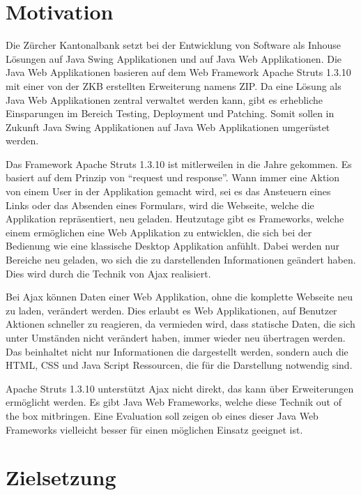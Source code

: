   \section{Motivation}
  
  Die Zürcher Kantonalbank setzt bei der Entwicklung von Software als Inhouse
  Lösungen auf Java Swing Applikationen und auf Java Web Applikationen. Die
  Java Web Applikationen basieren auf dem Web Framework Apache Struts 1.3.10
  mit einer von der ZKB erstellten Erweiterung namens \ac{ZIP}. Da eine Lösung
  als Java Web Applikationen zentral verwaltet werden kann, gibt es erhebliche
  Einsparungen im Bereich Testing, Deployment und Patching. Somit sollen in
  Zukunft Java Swing Applikationen auf Java Web Applikationen umgerüstet
  werden.
  
  Das Framework Apache Struts 1.3.10 ist mitlerweilen in die Jahre gekommen. Es
  basiert auf dem Prinzip von ``request und response''. Wann immer eine Aktion
  von einem User in der Applikation gemacht wird, sei es das Ansteuern eines
  Links oder das Absenden eines Formulars, wird die Webseite, welche die
  Applikation repräsentiert, neu geladen. Heutzutage gibt es Frameworks, welche
  einem ermöglichen eine Web Applikation zu entwicklen, die sich bei der
  Bedienung wie eine klassische Desktop Applikation anfühlt. Dabei werden
  nur Bereiche neu geladen, wo sich die zu darstellenden Informationen geändert
  haben. Dies wird durch die Technik von \ac{Ajax} realisiert.
  
  Bei \ac{Ajax} können Daten einer Web Applikation, ohne die komplette Webseite
  neu zu laden, verändert werden. Dies erlaubt es Web Applikationen, auf
  Benutzer Aktionen schneller zu reagieren, da vermieden wird, dass statische
  Daten, die sich unter Umständen nicht verändert haben, immer wieder neu
  übertragen werden. Das beinhaltet nicht nur Informationen die dargestellt
  werden, sondern auch die \ac{HTML}, \ac{CSS} und Java Script Ressourcen, die
  für die Darstellung notwendig sind.
  
  Apache Struts 1.3.10 unterstützt \ac{Ajax} nicht direkt, das kann über
  Erweiterungen ermöglicht werden. Es gibt Java Web Frameworks, welche diese
  Technik out of the box mitbringen. Eine Evaluation soll zeigen ob eines dieser
  Java Web Frameworks vielleicht besser für einen möglichen Einsatz geeignet
  ist.
  
  \clearpage
  
  \section{Zielsetzung}
  
